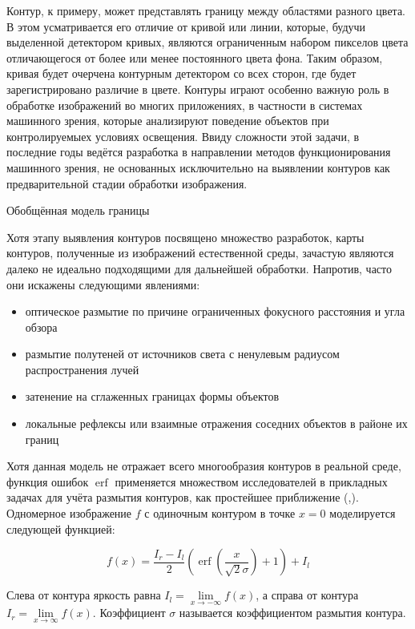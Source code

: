 \documentclass[a4paper,12pt]{report}
\begin{document}
Контур, к примеру, может представлять границу между областями разного цвета. В этом усматривается его отличие от кривой или линии, которые, будучи выделенной детектором кривых, являются ограниченным набором пикселов цвета отличающегося от более или менее постоянного цвета фона. Таким образом, кривая будет очерчена контурным детектором со всех сторон, где будет зарегистрировано различие в цвете. Контуры играют особенно важную роль в обработке изображений во многих приложениях, в частности в системах машинного зрения, которые анализируют поведение объектов при контролируемыех условиях освещения. Ввиду сложности этой задачи, в последние годы ведётся разработка в направлении методов функционирования машинного зрения, не основанных исключительно на выявлении контуров как предварительной стадии обработки изображения.

\Large{Обобщённая модель границы}

\normalsize Хотя этапу выявления контуров посвящено множество разработок, карты контуров, полученные из изображений естественной среды, зачастую являются далеко не идеально подходящими для дальнейшей обработки. Напротив, часто они искажены следующими явлениями:

\begin{itemize}
\item{оптическое размытие по причине ограниченных фокусного расстояния и угла обзора}
\item{размытие полутеней от источников света с ненулевым радиусом распространения лучей}
\item{затенение на сглаженных границах формы объектов}
\item{локальные рефлексы или взаимные отражения соседних объектов в районе их границ}
\end{itemize}

Хотя данная модель не отражает всего многообразия контуров в реальной среде, функция ошибок $\operatorname{erf}$ применяется множеством исследователей в прикладных задачах для учёта размытия контуров, как простейшее приближение (\cite{zhang},\cite{lindeberg}). Одномерное изображение $f$ с одиночным контуром в точке $x = 0$ моделируется следующей функцией:

\begin{equation}
f(x)=\frac{I_r - I_l}{2}\left( \operatorname{erf}\left(\frac{x}{\sqrt{2}\sigma}\right)+1\right) + I_l
\end{equation}

Слева от контура яркость равна $I_l=\underset{x\to -\infty}{\lim}f(x)$, а справа от контура $I_r=\underset{x\to \infty}{\lim}f(x)$. Коэффициент $\sigma$ называется коэффициентом размытия контура.
\end{document}

